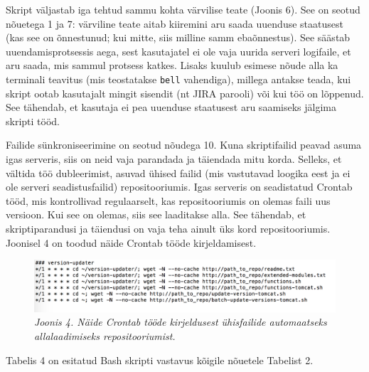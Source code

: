 \documentclass[12pt]{article}
\newcommand{\code}[1]{\texttt{#1}}
\begin{document}
   Skript väljastab iga tehtud sammu kohta värvilise teate (Joonis 6). See on seotud nõuetega 1 ja 7: värviline teate aitab kiiremini aru saada uuenduse staatusest (kas see on õnnestunud; kui mitte, siis milline samm ebaõnnestus). See säästab uuendamisprotsessis aega, sest kasutajatel ei ole vaja uurida serveri logifaile, et aru saada, mis sammul protsess katkes. Lisaks kuulub esimese nõude alla ka terminali teavitus (mis teostatakse \code{bell} vahendiga), millega antakse teada, kui skript ootab kasutajalt mingit sisendit (nt JIRA parooli) või kui töö on lõppenud. See tähendab, et kasutaja ei pea uuenduse staatusest aru saamiseks jälgima skripti tööd.
   
   Failide sünkroniseerimine on seotud nõudega 10. Kuna skriptifailid peavad asuma igas serveris, siis on neid vaja parandada ja täiendada mitu korda. Selleks, et vältida töö dubleerimist, asuvad ühised failid (mis vastutavad loogika eest ja ei ole serveri seadistusfailid) repositooriumis. Igas serveris on seadistatud Crontab \cite{cron} tööd, mis kontrollivad regulaarselt, kas repositooriumis on olemas faili uus versioon. Kui see on olemas, siis see laaditakse alla. See tähendab, et skriptiparandusi ja täiendusi on vaja teha ainult üks kord repositooriumis. Joonisel 4 on toodud näide Crontab tööde kirjeldamisest.
   \begin{figure}[H]
     \begin{center} 
       \includegraphics[width=\textwidth]{screenshots/crontab.png}
       \caption*{\textit{Joonis 4. Näide Crontab tööde kirjeldusest ühisfailide automaatseks allalaadimiseks repositooriumist.}}
     \end{center}
   \end{figure}
   
   \newpage
   
    Tabelis 4 on esitatud Bash skripti vastavus kõigile nõuetele Tabelist 2.
   
\end{document}
